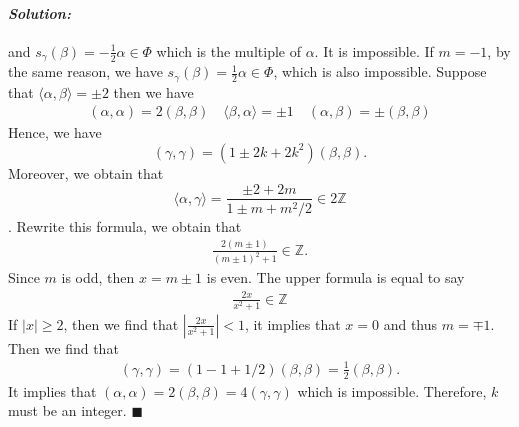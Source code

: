\documentclass[12pt, a4paper]{article}
\newenvironment{solution}
  {\paragraph{\textit{Solution:}}\par\medskip}
  {\hfill$\blacksquare$\vspace{0.1cm}}
\begin{document}
\begin{solution}
  and $s_\gamma(\beta) = -\frac{1}{2}\alpha\in \Phi$ which is the multiple of $\alpha$. It is impossible.
  If $m=-1$, by the same reason, we have $s_\gamma(\beta) = \frac{1}{2}\alpha \in \Phi$, which is also impossible.
  Suppose that $\langle \alpha, \beta \rangle = \pm 2$ then we have 
  \begin{align*}
    (\alpha, \alpha) = 2(\beta, \beta) \quad 
    \langle \beta, \alpha \rangle = \pm 1 \quad 
    (\alpha, \beta) = \pm (\beta, \beta)
  \end{align*}
  Hence, we have 
  $$(\gamma, \gamma) =  (1  \pm 2k + 2k^2)(\beta, \beta).$$
  Moreover, we obtain that 
  $$\langle \alpha, \gamma \rangle = \frac{\pm 2 + 2m}{1 \pm m + m^2/2} \in 2\mathbb{Z}$$.
  Rewrite this formula, we obtain that 
  \begin{align*}
    \frac{2(m\pm 1)}{(m\pm 1)^2+1}\in \mathbb{Z}.
  \end{align*}
  Since $m$ is odd, then $x = m\pm 1$ is even. The upper formula is equal to say 
  \begin{align*}
    \frac{2x}{x^2+1}\in\mathbb{Z}
  \end{align*}
  If $|x|\ge 2$, then we find that $|\frac{2x}{x^2+1}|<1$, it implies that $x=0$ and thus $m=\mp 1$. Then we find that 
  \begin{align*}
    (\gamma, \gamma) = (1 - 1 + 1/2)(\beta, \beta) = \frac{1}{2}(\beta, \beta).
  \end{align*}
  It implies that $(\alpha, \alpha) = 2(\beta, \beta) = 4(\gamma, \gamma)$ which is impossible. 
  Therefore, $k$ must be an integer.
\end{solution}
\end{document}
